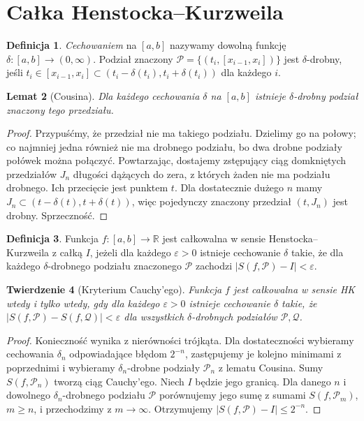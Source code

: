 \documentclass[11pt,a4paper]{article}
\numberwithin{equation}{section}
\theoremstyle{plain}
\newtheorem{twierdzenie}{Twierdzenie}[section]
\newtheorem{lemat}[twierdzenie]{Lemat}
\theoremstyle{definition}
\newtheorem{definicja}[twierdzenie]{Definicja}
\theoremstyle{remark}
\newcommand{\R}{\mathbb R}
\begin{document}
\section{Całka Henstocka--Kurzweila}
\begin{definicja}
\emph{Cechowaniem} na $[a,b]$ nazywamy dowolną funkcję $\delta:[a,b]\to(0,\infty)$. Podział znaczony $\mathcal P=\{(t_i,[x_{i-1},x_i])\}$ jest $\delta$-drobny, jeśli $t_i\in[x_{i-1},x_i]\subset(t_i-\delta(t_i),t_i+\delta(t_i))$ dla każdego $i$.
\end{definicja}
\begin{lemat}[Cousina]
Dla każdego cechowania $\delta$ na $[a,b]$ istnieje $\delta$-drobny podział znaczony tego przedziału.
\end{lemat}
\begin{proof}
Przypuśćmy, że przedział nie ma takiego podziału. Dzielimy go na połowy; co najmniej jedna również nie ma drobnego podziału, bo dwa drobne podziały połówek można połączyć. Powtarzając, dostajemy zstępujący ciąg domkniętych przedziałów $J_n$ długości dążących do zera, z których żaden nie ma podziału drobnego. Ich przecięcie jest punktem $t$. Dla dostatecznie dużego $n$ mamy $J_n\subset(t-\delta(t),t+\delta(t))$, więc pojedynczy znaczony przedział $(t,J_n)$ jest drobny. Sprzeczność.
\end{proof}
\begin{definicja}
Funkcja $f:[a,b]\to\R$ jest całkowalna w sensie Henstocka--Kurzweila z całką $I$, jeżeli dla każdego $\varepsilon>0$ istnieje cechowanie $\delta$ takie, że dla każdego $\delta$-drobnego podziału znaczonego $\mathcal P$ zachodzi $|S(f,\mathcal P)-I|<\varepsilon$.
\end{definicja}
\begin{twierdzenie}[Kryterium Cauchy'ego]
Funkcja $f$ jest całkowalna w sensie HK wtedy i tylko wtedy, gdy dla każdego $\varepsilon>0$ istnieje cechowanie $\delta$ takie, że $|S(f,\mathcal P)-S(f,\mathcal Q)|<\varepsilon$ dla wszystkich $\delta$-drobnych podziałów $\mathcal P,\mathcal Q$.
\end{twierdzenie}
\begin{proof}
Konieczność wynika z nierówności trójkąta. Dla dostateczności wybieramy cechowania $\delta_n$ odpowiadające błędom $2^{-n}$, zastępujemy je kolejno minimami z poprzednimi i wybieramy $\delta_n$-drobne podziały $\mathcal P_n$ z lematu Cousina. Sumy $S(f,\mathcal P_n)$ tworzą ciąg Cauchy'ego. Niech $I$ będzie jego granicą. Dla danego $n$ i dowolnego $\delta_n$-drobnego podziału $\mathcal P$ porównujemy jego sumę z sumami $S(f,\mathcal P_m)$, $m\ge n$, i przechodzimy z $m\to\infty$. Otrzymujemy $|S(f,\mathcal P)-I|\le2^{-n}$.
\end{proof}
\end{document}
